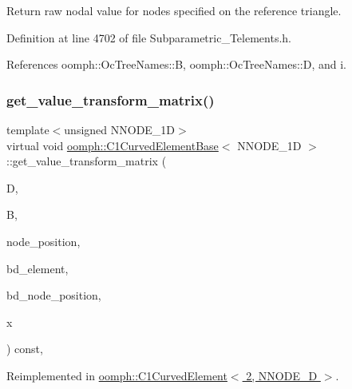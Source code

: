 Return raw nodal value for nodes specified on the reference triangle. 



Definition at line 4702 of file Subparametric\+\_\+\+Telements.\+h.



References oomph\+::\+Oc\+Tree\+Names\+::B, oomph\+::\+Oc\+Tree\+Names\+::D, and i.

\mbox{\label{classoomph_1_1C1CurvedElementBase_a4735f6f63d4e545608bf485c7168e251}} 
\subsubsection{\texorpdfstring{get\+\_\+value\+\_\+transform\+\_\+matrix()}{get\_value\_transform\_matrix()}}
{\footnotesize\ttfamily template$<$unsigned N\+N\+O\+D\+E\+\_\+1D$>$ \\
virtual void \hyperlink{classoomph_1_1C1CurvedElementBase}{oomph\+::\+C1\+Curved\+Element\+Base}$<$ N\+N\+O\+D\+E\+\_\+1D $>$\+::get\+\_\+value\+\_\+transform\+\_\+matrix (\begin{DoxyParamCaption}\item[{\hyperlink{classoomph_1_1DenseMatrix}{Dense\+Matrix}$<$ double $>$ \&}]{D,  }\item[{\hyperlink{classoomph_1_1DenseMatrix}{Dense\+Matrix}$<$ double $>$ \&}]{B,  }\item[{\hyperlink{classoomph_1_1DenseMatrix}{Dense\+Matrix}$<$ double $>$ \&}]{node\+\_\+position,  }\item[{unsigned \&}]{bd\+\_\+element,  }\item[{\hyperlink{classoomph_1_1DenseMatrix}{Dense\+Matrix}$<$ double $>$ \&}]{bd\+\_\+node\+\_\+position,  }\item[{\hyperlink{classoomph_1_1Vector}{Vector}$<$ double $>$ \&}]{x }\end{DoxyParamCaption}) const\hspace{0.3cm}{\ttfamily [inline]}, {\ttfamily [virtual]}}



Reimplemented in \hyperlink{classoomph_1_1C1CurvedElement_3_012_00_01NNODE__1D_01_4_a4cb17f4e7f9253ff739a6102f1f39158}{oomph\+::\+C1\+Curved\+Element$<$ 2, N\+N\+O\+D\+E\+\_\+D $>$}.



